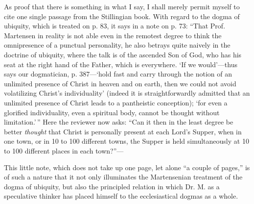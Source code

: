 \documentclass[12pt,a4paper,openany]{book}
\newcommand{\opage}[1]{\marginnote{\footnotesize\textit{[#1]}}}
\begin{document}
As proof that there is something in what I say,
I shall merely permit myself to cite one single passage from
the Stillingian book. With regard to the dogma of ubiquity,
which is treated on p. 83, it says in a note on p. 73:
``That Prof. Martensen in reality is not able even in the remotest
degree to think the omnipresence of a punctual personality,
he also betrays quite naively in the doctrine of ubiquity,
where the talk is of the ascended Son of God, who
has his seat at the right hand of the Father, which is everywhere.
`If we would'---thus says our dogmatician, p. 387---`hold
fast and carry through the notion of an unlimited
presence of Christ in heaven and on earth, then we could
not avoid volatilizing Christ's individuality' (indeed
it is straightforwardly admitted that an unlimited presence of Christ
leads to a pantheistic conception); `for even a glorified
individuality, even a spiritual body, cannot be
\setcounter{footnote}{0}%
\opage{31}thought without limitation.'\,'' Here the reviewer now asks: ``Can
it then in the least degree be better \emph{thought} that Christ
is personally present at each Lord's Supper, when in one town,
or in 10 to 100 different towns, the Supper is held simultaneously
at 10 to 100 different places in each town?''---

This little note, which does not take up one page, let
alone ``a couple of pages,'' is of such a nature that it not
only illuminates the Martensenian treatment of the dogma of ubiquity,
but also the principled relation in which Dr. M. as a
speculative thinker has placed himself to the ecclesiastical dogmas
as a whole.
\end{document}
